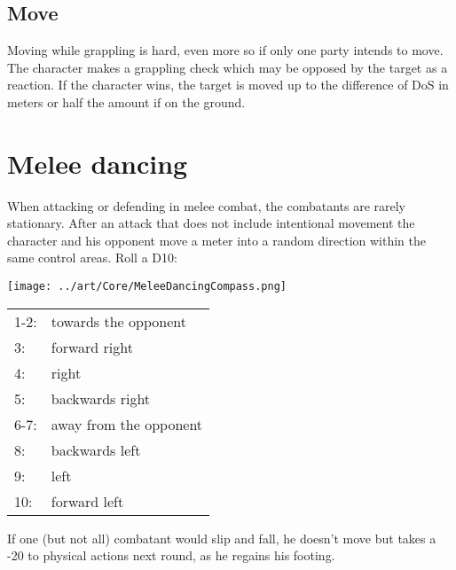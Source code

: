 \subsection*{Move}
Moving while grappling is hard, even more so if only one party intends to move.\\
The character makes a grappling check which may be opposed by the target as a reaction. If the character wins, the target is moved up to the difference of DoS in meters or half the amount if on the ground.

\section{Melee dancing}
When attacking or defending in melee combat,
	the combatants are rarely stationary.
After an attack that does not include intentional movement the character
and his opponent move a meter into a random direction within the same control areas.
Roll a D10:
\par
\begin{multicols}{2}
\texttt{[image: ../art/Core/MeleeDancingCompass.png]}
\columnbreak
\begin{tabular}{ll}
	1-2: & towards the opponent\\
	3:   & forward right\\
	4:   & right\\
	5:   & backwards right\\
	6-7: & away from the opponent\\
	8:   & backwards left\\
	9:   & left\\
	10:  & forward left
\end{tabular}
\end{multicols}
If one (but not all) combatant would slip and fall,
	he doesn’t move but takes a -20 to physical actions next round,
	as he regains his footing.
